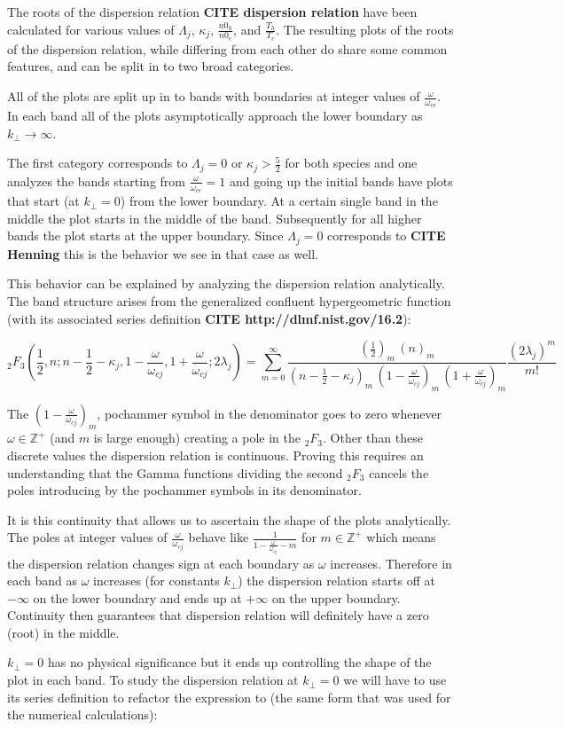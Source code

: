 \documentclass[12pt,a4paper]{article}
\begin{document}
    The roots of the dispersion relation \textbf{CITE dispersion relation} have been calculated for various values of $\Lambda_j$, $\kappa_j$, $\frac{n0_h}{n0_e}$, and $\frac{T_h}{T_c}$.
    The resulting plots of the roots of the dispersion relation, while differing from each other do share some common features, and can be split in to two broad categories.

    All of the plots are split up in to bands with boundaries at integer values of $\frac{\omega}{\omega_{ce}}$.
    In each band all of the plots asymptotically approach the lower boundary as $k_\perp \rightarrow \infty$.

    The first category corresponds to $\Lambda_j = 0$ or $\kappa_j > \frac{5}{2}$ for both species and one analyzes the bands starting from $\frac{\omega}{\omega_{ce}} = 1$ and going up the initial bands have plots that start (at $k_\perp = 0$) from the lower boundary. At a certain single band in the middle the plot starts in the middle of the band.
    Subsequently for all higher bands the plot starts at the upper boundary.
    Since $\Lambda_j = 0$ corresponds to \textbf{CITE Henning} this is the behavior we see in that case as well.

    This behavior can be explained by analyzing the dispersion relation analytically.
    The band structure arises from the generalized confluent hypergeometric function (with its associated series definition \textbf{CITE http://dlmf.nist.gov/16.2}):

    \begin{equation}
        _2F_3\left(\frac{1}{2}, n; n - \frac{1}{2} - \kappa_j, 1 - \frac{\omega}{\omega_{cj}}, 1 + \frac{\omega}{\omega_{cj}}; 2 \lambda_j \right) = \sum_{m = 0}^{\infty} \frac{(\frac{1}{2})_m \, (n)_m}{(n - \frac{1}{2} - \kappa_j)_m \, (1 - \frac{\omega}{\omega_{cj}})_m \, (1 + \frac{\omega}{\omega_{cj}})_m} \frac{(2 \lambda_j)^m}{m!}
    \end{equation}

    The $(1 - \frac{\omega}{\omega_{cj}})_m$, pochammer symbol in the denominator goes to zero whenever $\omega \in \mathbb{Z}^+$ (and $m$ is large enough) creating a pole in the $_2F_3$.
    Other than these discrete values the dispersion relation is continuous.
    Proving this requires an understanding that the Gamma functions dividing the second $_2F_3$ cancels the poles introducing by the pochammer symbols in its denominator.

    It is this continuity that allows us to ascertain the shape of the plots analytically. The poles at integer values of $\frac{\omega}{\omega_{cj}}$ behave like $\frac{1}{1 - \frac{\omega}{\omega_{cj}} - m}$ for $m \in \mathbb{Z}^+$ which means the dispersion relation changes sign at each boundary as $\omega$ increases. Therefore in each band as $\omega$ increases (for constants $k_\perp$) the dispersion relation starts off at $-\infty$ on the lower boundary and ends up at $+\infty$ on the upper boundary. Continuity then guarantees that dispersion relation will definitely have a zero (root) in the middle.

    $k_\perp = 0$ has no physical significance but it ends up controlling the shape of the plot in each band. To study the dispersion relation at $k_\perp = 0$ we will have to use its series definition to refactor the expression to (the same form that was used for the numerical calculations):
\end{document}
